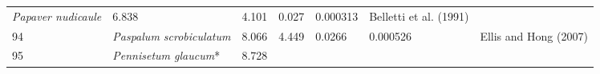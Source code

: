 \documentclass[]{article}
\begin{document}
\begin{longtable}[]{@{}lllllll@{}}
\begin{minipage}[t]{0.23\columnwidth}
\emph{Papaver nudicaule}\strut
\end{minipage} & \begin{minipage}[t]{0.05\columnwidth}\raggedright
6.838\strut
\end{minipage} & \begin{minipage}[t]{0.08\columnwidth}\raggedright
4.101\strut
\end{minipage} & \begin{minipage}[t]{0.08\columnwidth}\raggedright
0.027\strut
\end{minipage} & \begin{minipage}[t]{0.08\columnwidth}\raggedright
0.000313\strut
\end{minipage} & \begin{minipage}[t]{0.23\columnwidth}\raggedright
Belletti et al. (1991)\strut
\end{minipage}\tabularnewline
\begin{minipage}[t]{0.05\columnwidth}\raggedright
94\strut
\end{minipage} & \begin{minipage}[t]{0.23\columnwidth}\raggedright
\emph{Paspalum scrobiculatum}\strut
\end{minipage} & \begin{minipage}[t]{0.05\columnwidth}\raggedright
8.066\strut
\end{minipage} & \begin{minipage}[t]{0.08\columnwidth}\raggedright
4.449\strut
\end{minipage} & \begin{minipage}[t]{0.08\columnwidth}\raggedright
0.0266\strut
\end{minipage} & \begin{minipage}[t]{0.08\columnwidth}\raggedright
0.000526\strut
\end{minipage} & \begin{minipage}[t]{0.23\columnwidth}\raggedright
Ellis and Hong (2007)\strut
\end{minipage}\tabularnewline
\begin{minipage}[t]{0.05\columnwidth}\raggedright
95\strut
\end{minipage} & \begin{minipage}[t]{0.23\columnwidth}\raggedright
\emph{Pennisetum glaucum}*\strut
\end{minipage} & \begin{minipage}[t]{0.05\columnwidth}\raggedright
8.728\strut
\end{minipage} & \begin{minipage}[t]{0.08\columnwidth}\raggedright

\end{minipage}
\end{longtable}
\end{document}
